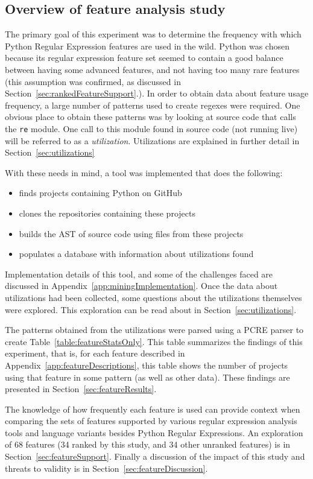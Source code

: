 \subsection{Overview of feature analysis study}

The primary goal of this experiment was to determine the frequency with which Python Regular Expression features are used in the wild.  Python was chosen because its regular expression feature set seemed to contain a good balance between having some advanced features, and not having too many rare features (this assumption was confirmed, as discussed in Section~\ref{sec:rankedFeatureSupport}.).  In order to obtain data about feature usage frequency, a large number of patterns used to create regexes were required.  One obvious place to obtain these patterns was by looking at source code that calls the {\tt re} module.  One call to this module found in source code (not running live) will be referred to as a \emph{utilization}.  Utilizations are explained in further detail in Section~\ref{sec:utilizations}

With these needs in mind, a tool was implemented that does the following:
\begin{itemize} \itemsep -1pt
\item finds projects containing Python on GitHub
\item clones the repositories containing these projects
\item builds the AST of source code using files from these projects
\item populates a database with information about utilizations found
\end{itemize}

Implementation details of this tool, and some of the challenges faced are discussed in Appendix~\ref{app:miningImplementation}.  Once the data about utilizations had been collected, some questions about the utilizations themselves were explored.  This exploration can be read about in Section~\ref{sec:utilizations}.

The patterns obtained from the utilizations were parsed using a PCRE parser to create Table~\ref{table:featureStatsOnly}.  This table summarizes the findings of this experiment, that is, for each feature described in Appendix~\ref{app:featureDescriptions}, this table shows the number of projects using that feature in some pattern (as well as other data).  These findings are presented in Section~\ref{sec:featureResults}.

The knowledge of how frequently each feature is used can provide context when comparing the sets of features supported by various regular expression analysis tools and language variants besides Python Regular Expressions.  An exploration of 68 features (34 ranked by this study, and 34 other unranked features) is in Section~\ref{sec:featureSupport}.  Finally a discussion of the impact of this study and threats to validity is in Section~\ref{sec:featureDiscussion}.
